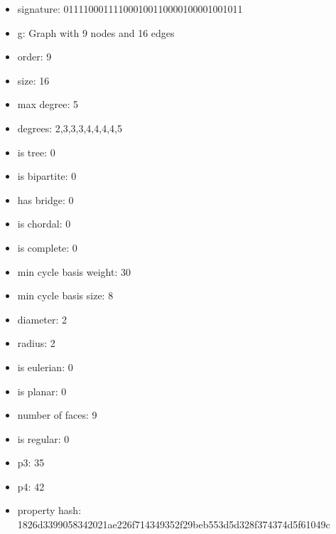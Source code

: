 \newpage
\begin{figure}
\end{figure}
\begin{itemize}
\item signature: 011110001111000100110000100001001011
\item g: Graph with 9 nodes and 16 edges
\item order: 9
\item size: 16
\item max degree: 5
\item degrees: 2,3,3,3,4,4,4,4,5
\item is tree: 0
\item is bipartite: 0
\item has bridge: 0
\item is chordal: 0
\item is complete: 0
\item min cycle basis weight: 30
\item min cycle basis size: 8
\item diameter: 2
\item radius: 2
\item is eulerian: 0
\item is planar: 0
\item number of faces: 9
\item is regular: 0
\item p3: 35
\item p4: 42
\item property hash: 1826d3399058342021ae226f714349352f29beb553d5d328f374374d5f61049c
\end{itemize}
